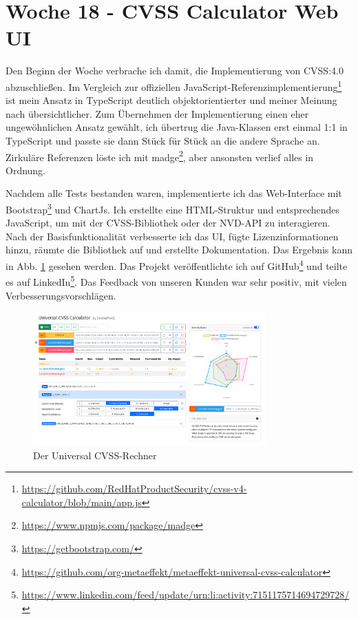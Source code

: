 \section{Woche 18 - CVSS Calculator Web UI} \label{sec:bericht-wo-18}


\lweekdaymarginpar{\weekdayMondayShort, \weekdayTuesdayShort}

Den Beginn der Woche verbrache ich damit, die Implementierung von CVSS:4.0 abzuschließen.
Im Vergleich zur offiziellen JavaScript-Referenzimplementierung\footnote{\url{https://github.com/RedHatProductSecurity/cvss-v4-calculator/blob/main/app.js}} ist mein Ansatz in TypeScript deutlich objektorientierter und meiner Meinung nach übersichtlicher.
Zum Übernehmen der Implementierung einen eher ungewöhnlichen Ansatz gewählt, ich übertrug die Java-Klassen erst einmal 1:1 in TypeScript und passte sie dann Stück für Stück an die andere Sprache an.
Zirkuläre Referenzen löste ich mit madge\footnote{\url{https://www.npmjs.com/package/madge}}, aber ansonsten verlief alles in Ordnung.

\sweekdaymarginpar{\weekdayWednesdayShort\ - \weekdayFridayShort}

Nachdem alle Tests bestanden waren, implementierte ich das Web-Interface mit Bootstrap\footnote{\url{https://getbootstrap.com/}} und ChartJs.
Ich erstellte eine HTML-Struktur und entsprechendes JavaScript, um mit der CVSS-Bibliothek oder der NVD-API zu interagieren.
Nach der Basisfunktionalität verbesserte ich das UI, fügte Lizenzinformationen hinzu, räumte die Bibliothek auf und erstellte Dokumentation.
Das Ergebnis kann in Abb. \ref{fig:metaeffekt-cvss-calculator-ui} gesehen werden.
Das Projekt veröffentlichte ich auf GitHub\footnote{\url{https://github.com/org-metaeffekt/metaeffekt-universal-cvss-calculator}} und teilte es auf LinkedIn\footnote{\url{https://www.linkedin.com/feed/update/urn:li:activity:7151175714694729728/}}.
Das Feedback von unseren Kunden war sehr positiv, mit vielen Verbesserungsvorschlägen.

\begin{figure}[htbp] %
    \centering
    \includegraphics[width=0.8\textwidth, keepaspectratio]{res/img/metaeffekt-cvss-calculator-ui}
    \caption{Der {\metaeffekt} Universal CVSS-Rechner}
    \label{fig:metaeffekt-cvss-calculator-ui}
\end{figure}

